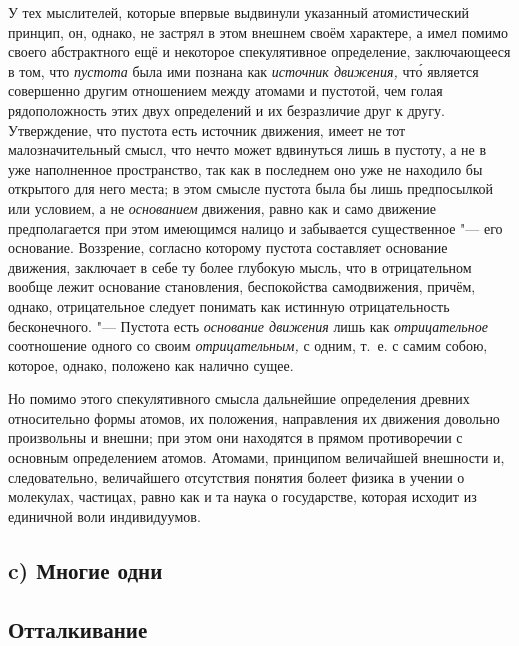 У тех мыслителей, которые впервые выдвинули указанный атомистический
принцип, он, однако, не застрял в этом внешнем своём характере, а имел
помимо своего абстрактного ещё и некоторое спекулятивное определение,
заключающееся в том, что {\em пустота} была ими познана
как {\em источник движения,} чт\'{о} является совершенно
другим отношением между атомами и пустотой, чем голая рядоположность этих
двух определений и их безразличие друг к другу. Утверждение, что пустота
есть источник движения, имеет не тот малозначительный смысл, что нечто
может вдвинуться лишь в пустоту, а не в уже наполненное пространство, так
как в последнем оно уже не находило бы открытого для него места; в этом
смысле пустота была бы лишь предпосылкой или условием, а не
{\em основанием} движения, равно как и само движение
предполагается при этом имеющимся налицо и забывается существенное "--- его
основание. Воззрение, согласно которому пустота составляет основание
движения, заключает в себе ту более глубокую мысль, что в отрицательном
вообще лежит основание становления, беспокойства самодвижения, причём,
однако, отрицательное следует понимать как истинную отрицательность
бесконечного. "--- Пустота есть {\em основание движения}
лишь как {\em отрицательное} соотношение одного со
своим {\em отрицательным,} с одним, т.~е. с самим
собою, которое, однако, положено как налично сущее.

Но помимо этого спекулятивного смысла дальнейшие определения древних
относительно формы атомов, их положения, направления их движения довольно
произвольны и внешни; при этом они находятся в прямом противоречии с
основным определением атомов. Атомами, принципом величайшей внешности и,
следовательно, величайшего отсутствия понятия болеет физика в учении о
молекулах, частицах, равно как и та наука о государстве, которая исходит из
единичной воли индивидуумов.

\subsection[c) Многие одни. Отталкивание]%
{c) Многие одни\\\vspace{2mm}\\{\mdseries\lsstyle Отталкивание}}

